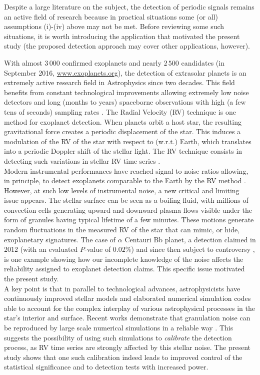 \documentclass[journal]{IEEEtran}
\begin{document}
Despite a large literature on the subject, the detection of periodic signals remains an active field of research because in practical situations some (or all) assumptions (i)-(iv) above may not be met. Before reviewing some such situations, it is worth introducing the  application that motivated the present study 
{ (the proposed detection approach may cover other applications, however).}

With almost { $3\,000$} confirmed exoplanets and nearly { $2\,500$} candidates (in { September} 2016,  \url{www.exoplanets.org}), the detection of extrasolar planets is an extremely active research field in Astrophysics since two decades. This field  benefits from constant technological improvements allowing extremely low noise detectors \cite{Pepe_2014b} and  long (months to years) spaceborne observations with high (a few tens of seconds) sampling rates{ \cite{Batalha_2014, Auvergne_2009, Rauer_2014}}. 
The Radial Velocity (RV)  technique is one method for exoplanet detection. When planets orbit a  host star, the resulting { gravitational} force creates a periodic displacement of the star. 
This induces a modulation of the RV of the star with respect to (w.r.t.) Earth, which translates into a periodic Doppler shift of the stellar light.  The RV  technique consists in detecting such variations in stellar RV time series {\cite{Fischer_2014,Perryman_2011}.}\\
Modern instrumental performances have reached signal to noise ratios allowing, in principle, to detect exoplanets comparable to the Earth {by} the RV method
. However, at such low  levels of instrumental noise, a new critical and limiting issue appears. The stellar surface can be seen as a boiling fluid, with millions of convection cells generating  upward and downward plasma flows visible under the form of granules having typical lifetime of a few minutes. These motions generate random fluctuations in the measured RV of the star that can mimic, or hide, exoplanetary signatures.
The  case of  $\alpha$ Centauri Bb planet,  a detection claimed in 2012 \cite{Dumusque_2012} (with an evaluated $P$-value of $0.02 \%$) and since then subject to controversy \cite{Hatzes_2013, Rajpaul_2016}, is one example showing how our incomplete knowledge of the noise affects the reliability assigned to  exoplanet detection claims. This specific issue motivated the present study.\\
A key point is that in parallel to  technological advances,   astrophysicists have continuously improved stellar models and elaborated numerical simulation codes able to account for the complex interplay of various astrophysical processes in the star's interior and surface.  Recent works  demonstrate that 
{ granulation noise }  can be reproduced by large scale numerical simulations in a reliable way \cite{Bigot_2011}. This suggests the possibility of using such simulations to \textit{calibrate} the detection process, as RV time series are strongly affected by  this stellar noise. The present study shows that { one such calibration} indeed leads to improved  control of the statistical significance and to detection tests with increased power. 
\end{document}
